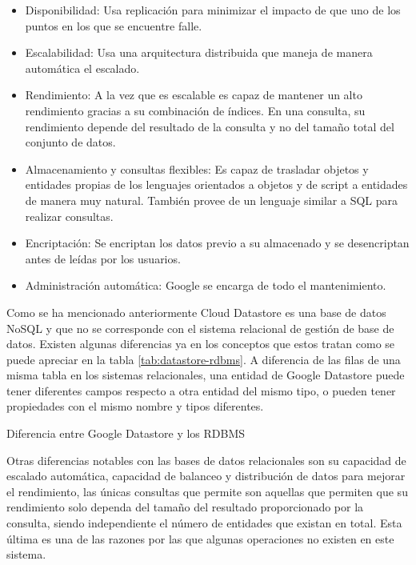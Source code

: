 \begin{itemize}
\item Disponibilidad: Usa replicación para minimizar el impacto de que uno de los puntos en los que se encuentre falle.
\item Escalabilidad: Usa una arquitectura distribuida que maneja de manera automática el escalado.
\item Rendimiento: A la vez que es escalable es capaz de mantener un alto rendimiento gracias a su combinación de índices. En una consulta, su rendimiento depende del resultado de la consulta y no del tamaño total del conjunto de datos.
\item Almacenamiento y consultas flexibles: Es capaz de trasladar objetos y entidades propias de los lenguajes orientados a objetos y de script a entidades de manera muy natural. También provee de un lenguaje similar a SQL para realizar consultas.
\item Encriptación: Se encriptan los datos previo a su almacenado y se desencriptan antes de leídas por los usuarios.
\item Administración automática: Google se encarga de todo el mantenimiento.
\end{itemize} 

Como se ha mencionado anteriormente Cloud Datastore es una base de datos NoSQL y que no se corresponde con el sistema relacional de gestión de base de datos. Existen algunas diferencias ya en los conceptos que estos tratan como se puede apreciar en la tabla \ref{tab:datastore-rdbms}. A diferencia de las filas de una misma tabla en los sistemas relacionales, una entidad de Google Datastore puede tener diferentes campos respecto a otra entidad del mismo tipo, o pueden tener propiedades con el mismo nombre y tipos diferentes. 

\begin{table}[hp]
  \centering
  {\small
  
  }
  \caption[Diferencia entre Google Datastore y los \acs{RDBMS}]
  {Diferencia entre Google Datastore y los \acs{RDBMS}}
  \label{tab:datastore-rdbms}
\end{table}

Otras diferencias notables con las bases de datos relacionales son su capacidad de escalado automática, capacidad de balanceo y distribución de datos para mejorar el rendimiento, las únicas consultas que permite son aquellas que permiten que su rendimiento solo dependa del tamaño del resultado proporcionado por la consulta, siendo independiente el número de entidades que existan en total. Esta última es una de las razones por las que algunas operaciones no existen en este sistema.

